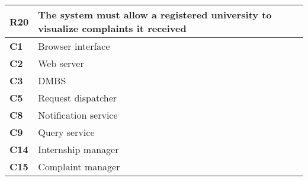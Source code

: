 \begin{table}[H]
    \centering
    \begin{tabular}{|l|m{10cm}|}
        \hline \textbf{R20} & The system must allow a registered university to visualize complaints it received \\
        \hline \textbf{C1} & Browser interface \\
        \hline \textbf{C2} & Web server \\
        \hline \textbf{C3} & DMBS \\
        \hline \textbf{C5} & Request dispatcher \\
        \hline \textbf{C8} & Notification service \\
        \hline \textbf{C9} & Query service \\
        \hline \textbf{C14} & Internship manager \\
        \hline \textbf{C15} & Complaint manager \\
        \hline
    \end{tabular}
\end{table}

